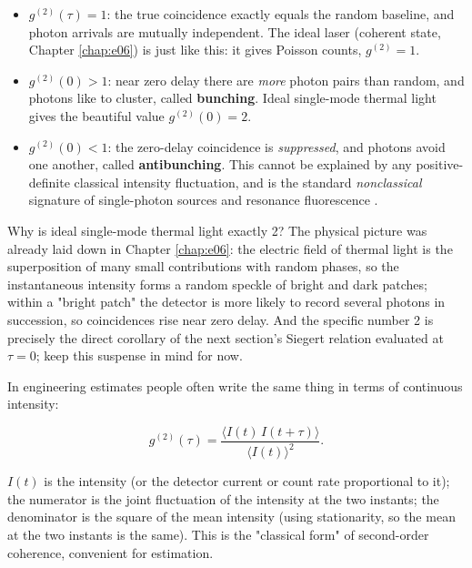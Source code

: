 \begin{itemize}
  \item \(g^{(2)}(\tau)=1\): the true coincidence exactly equals the random baseline, and photon arrivals are mutually independent. The ideal laser (coherent state, Chapter \ref{chap:e06}) is just like this: it gives Poisson counts, \(g^{(2)}=1\).
  \item \(g^{(2)}(0)>1\): near zero delay there are \emph{more} photon pairs than random, and photons like to cluster, called \textbf{bunching}. Ideal single-mode thermal light gives the beautiful value \(g^{(2)}(0)=2\).
  \item \(g^{(2)}(0)<1\): the zero-delay coincidence is \emph{suppressed}, and photons avoid one another, called \textbf{antibunching}. This cannot be explained by any positive-definite classical intensity fluctuation, and is the standard \emph{nonclassical} signature of single-photon sources and resonance fluorescence \citep{1977PhRvL..39..691K}.
\end{itemize}

Why is ideal single-mode thermal light exactly 2? The physical picture was already laid down in Chapter \ref{chap:e06}: the electric field of thermal light is the superposition of many small contributions with random phases, so the instantaneous intensity forms a random speckle of bright and dark patches; within a "bright patch" the detector is more likely to record several photons in succession, so coincidences rise near zero delay. And the specific number 2 is precisely the direct corollary of the next section's Siegert relation evaluated at \(\tau=0\); keep this suspense in mind for now.

In engineering estimates people often write the same thing in terms of continuous intensity:

\begin{equation}
  g^{(2)}(\tau)=\frac{\big\langle I(t)\,I(t+\tau)\big\rangle}{\big\langle I(t)\big\rangle^2}.
  \label{eq:e08-g2-classical}
\end{equation}
\begin{formulaexplain}
\(I(t)\) is the intensity (or the detector current or count rate proportional to it); the numerator is the joint fluctuation of the intensity at the two instants; the denominator is the square of the mean intensity (using stationarity, so the mean at the two instants is the same). This is the "classical form" of second-order coherence, convenient for estimation.
\end{formulaexplain}

